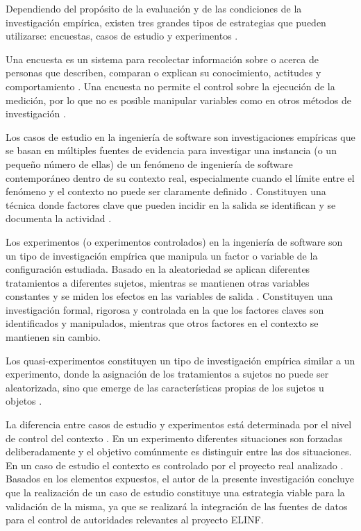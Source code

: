 Dependiendo del propósito de la evaluación y de las condiciones de la investigación empírica, existen tres grandes tipos de estrategias que pueden utilizarse: encuestas, casos de estudio y experimentos \citep{Wohlin2012}.

Una encuesta es un sistema para recolectar información sobre o acerca de personas que describen, comparan o explican su conocimiento, actitudes y comportamiento \citep{Wohlin2012}. Una encuesta no permite el control sobre la ejecución de la medición, por lo que no es posible manipular variables como en otros métodos de investigación \citep{Wohlin2012}.

Los casos de estudio en la ingeniería de software son investigaciones empíricas que se basan en múltiples fuentes de evidencia para investigar una instancia (o un pequeño número de ellas) de un fenómeno de ingeniería de software contemporáneo dentro de su contexto real, especialmente cuando el límite entre el fenómeno y el contexto no puede ser claramente definido \citep{Runeson:2012:CSR:2361717,Wohlin2012}. Constituyen una técnica donde factores clave que pueden incidir en la salida se identifican y se documenta la actividad \citep{stake1995art}. 

Los experimentos (o experimentos controlados) en la ingeniería de software son un tipo de investigación empírica que manipula un factor o variable de la configuración estudiada. Basado en la aleatoriedad se aplican diferentes tratamientos a diferentes sujetos, mientras se mantienen otras variables constantes y se miden los efectos en las variables de salida \citep{Wohlin2012}. Constituyen una investigación formal, rigorosa y controlada en la que los factores claves son identificados y manipulados, mientras que otros factores en el contexto se mantienen sin cambio.

Los quasi-experimentos constituyen un tipo de investigación empírica similar a un experimento, donde la asignación de los tratamientos a sujetos no puede ser aleatorizada, sino que emerge de las características propias de los sujetos u objetos \citep{Wohlin2012}. 

La diferencia entre casos de estudio y experimentos está determinada por el nivel de control del contexto \citep{Petersen:2009:CIS:1671248.1671293}. En un experimento diferentes situaciones son forzadas deliberadamente y el objetivo comúnmente es distinguir entre las dos situaciones. En un caso de estudio el contexto es controlado por el proyecto real analizado \citep{Wohlin2012}. Basados en los elementos expuestos, el autor de la presente investigación concluye que la realización de un caso de estudio constituye una estrategia viable para la validación de la misma, ya que se realizará la integración de las fuentes de datos para el control de autoridades relevantes al proyecto ELINF. 

